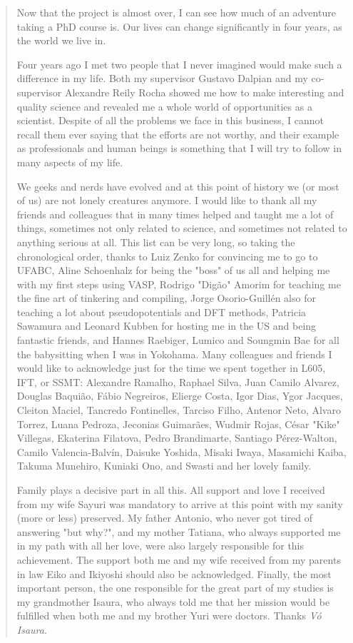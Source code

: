 \begin{quote}
Now that the project is almost over, I can see how much of an adventure taking a PhD course is. Our lives can change significantly in four years, as the world we live in.

Four years ago I met two people that I never imagined would make such a difference in my life. Both my supervisor Gustavo Dalpian and my co-supervisor Alexandre Reily Rocha showed me how to make interesting and quality science and revealed me a whole world of opportunities as a scientist. Despite of all the problems we face in this business, I cannot recall them ever saying that the efforts are not worthy, and their example as professionals and human beings is something that I will try to follow in many aspects of my life. 

We geeks and nerds have evolved and at this point of history we (or most of us) are not lonely creatures anymore. I would like to thank all my friends and colleagues that in many times helped and taught me a lot of things, sometimes not only related to science, and sometimes not related to anything serious at all. This list can be very long, so taking the chronological order, thanks to Luiz Zenko for convincing me to go to UFABC, Aline Schoenhalz for being the "boss" of us all and helping me with my first steps using VASP, Rodrigo "Digão" Amorim for teaching me the fine art of tinkering and compiling, Jorge Osorio-Guillén also for teaching a lot about pseudopotentials and DFT methods, Patricia Sawamura and Leonard Kubben for hosting me in the US and being fantastic friends, and Hannes Raebiger, Lumico and Soungmin Bae for all the babysitting when I was in Yokohama. Many colleagues and friends I would like to acknowledge just for the time we spent together in L605, IFT, or SSMT: Alexandre Ramalho, Raphael Silva, Juan Camilo Alvarez, Douglas Baquião, Fábio Negreiros, Elierge Costa, Igor Dias, Ygor Jacques, Cleiton Maciel, Tancredo Fontinelles, Tarciso Filho, Antenor Neto, Alvaro Torrez, Luana Pedroza, Jeconias Guimarães, Wudmir Rojas, César "Kike" Villegas, Ekaterina Filatova, Pedro Brandimarte, Santiago Pérez-Walton, Camilo Valencia-Balvín, Daisuke Yoshida, Misaki Iwaya, Masamichi Kaiba, Takuma Munehiro, Kuniaki Ono, and Swasti and her lovely family.

Family plays a decisive part in all this. All support and love I received from my wife Sayuri was mandatory to arrive at this point with my sanity (more or less) preserved. My father Antonio, who never got tired of answering "but why?", and my mother Tatiana, who always supported me in my path with all her love, were also largely responsible for this achievement. The support both me and my wife received from my parents in law Eiko and Ikiyoshi should also be acknowledged. Finally, the most important person, the one responsible for the great part of my studies is my grandmother Isaura, who always told me that her mission would be fulfilled when both me and my brother Yuri were doctors. Thanks \textit{Vó Isaura}.


\end{quote}
